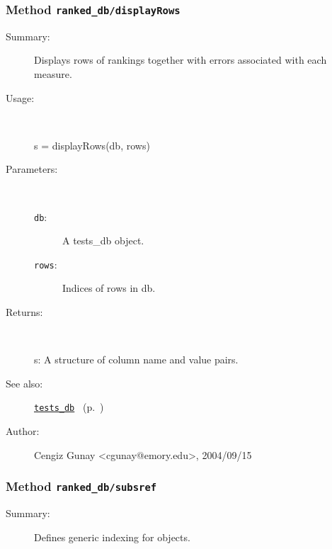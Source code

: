 \subsubsection[Method \texttt{displayRows}]{Method \texttt{ranked\_db/displayRows}}%
%
\label{ref_ranked_db__displayRows}%
\hypertarget{ref_ranked_db__displayRows}{}%
\begin{description}
\item[Summary:]Displays rows of rankings together with errors associated with each measure.
%
\item[Usage:]~%
\begin{lyxcode}%
s = displayRows(db, rows)
%
\end{lyxcode}%
%
%
\item[Parameters:]~
\begin{description}%
\item[\texttt{db}:]
 A tests\_db object.
\item[\texttt{rows}:]
 Indices of rows in db.
\end{description}%
%
\item[Returns:]~

	s: A structure of column name and value pairs.
%
%
\item[See also:]%
\hyperlink{ref_tests_db}{\texttt{tests\_db}}%
\ (p.~\pageref{ref_tests_db})%
%
%
\item[Author:]%
Cengiz Gunay <cgunay@emory.edu>, 2004/09/15%
\end{description}
\methodline%
\subsubsection[Method \texttt{subsref}]{Method \texttt{ranked\_db/subsref}}%
%
\label{ref_ranked_db__subsref}%
\hypertarget{ref_ranked_db__subsref}{}%
\begin{description}
\item[Summary:]Defines generic indexing for objects.
%
%
%
%
%
%
%
%
\end{description}
\methodline%

